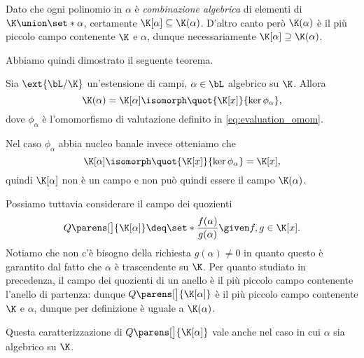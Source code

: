 Dato che ogni polinomio in $\alpha$ è \emph{combinazione algebrica} di elementi di $\K \union \set*{\alpha}$, certamente $\K[\alpha] \subseteq \K(\alpha)$. D'altro canto però $\K(\alpha)$ è il più piccolo campo contenente $\K$ e $\alpha$, dunque necessariamente $\K[\alpha] \supseteq \K(\alpha)$.

Abbiamo quindi dimostrato il seguente teorema.

\begin{theorem}
    {}{}
    Sia $\ext{\bL / \K}$ un'estensione di campi, $\alpha \in \bL$ algebrico su $\K$. Allora \[
        \K(\alpha) = \K[\alpha] \isomorph \quot{\K[x]}{\ker \phi_\alpha},
    \] dove $\phi_\alpha$ è l'omomorfismo di valutazione definito in \eqref{eq:evaluation_omom}.
\end{theorem}

Nel caso $\phi_\alpha$ abbia nucleo banale invece otteniamo che \[
    \K[\alpha] \isomorph \quot{\K[x]}{\ker \phi_\alpha} = \K[x],
\] quindi $\K[\alpha]$ non è un campo e non può quindi essere il campo $\K(\alpha)$.  

Possiamo tuttavia considerare il campo dei quozienti \[
    Q\parens[\big]{\K[\alpha]} \deq \set*{\frac{f(\alpha)}{g(\alpha)} \given f, g \in \K[x]}.
\] Notiamo che non c'è bisogno della richiesta $g(\alpha) \neq 0$ in quanto questo è garantito dal fatto che $\alpha$ è trascendente su $\K$. Per quanto studiato in precedenza, il campo dei quozienti di un anello è il più piccolo campo contenente l'anello di partenza: dunque $Q\parens[\big]{\K[\alpha]}$ è il più piccolo campo contenente $\K$ e $\alpha$, dunque per definizione è uguale a $\K(\alpha)$.

\begin{remark}
    Questa caratterizzazione di $Q\parens[\big]{\K[\alpha]}$ vale anche nel caso in cui $\alpha$ sia algebrico su $\K$. 
\end{remark}

